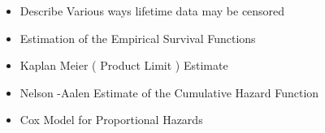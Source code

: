 \begin{itemize}

\item Describe Various ways lifetime data may be censored

\item Estimation of the Empirical Survival Functions

\item Kaplan Meier ( Product Limit ) Estimate

\item Nelson -Aalen Estimate of the Cumulative Hazard Function

\item Cox Model for Proportional Hazards

\end{itemize}
